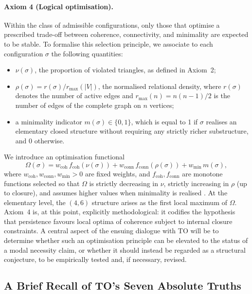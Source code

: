 \documentclass[11pt,a4paper]{article}
\begin{document}
\paragraph{Axiom 4 (Logical optimisation).}
Within the class of admissible configurations, only those that optimise a prescribed trade-off between coherence, connectivity, and minimality are expected to be stable. To formalise this selection principle, we associate to each configuration \(\sigma\) the following quantities:
\begin{itemize}
  \item \(\nu(\sigma)\), the proportion of violated triangles, as defined in Axiom~2;
  \item \(\rho(\sigma) = r(\sigma)/r_{\max}(|V|)\), the normalised relational density, where \(r(\sigma)\) denotes the number of active edges and \(r_{\max}(n) = n(n-1)/2\) is the number of edges of the complete graph on \(n\) vertices;
  \item a minimality indicator \(m(\sigma) \in \{0,1\}\), which is equal to 1 if \(\sigma\) realises an elementary closed structure without requiring any strictly richer substructure, and 0 otherwise.
\end{itemize}
We introduce an optimisation functional
\[
\Omega(\sigma) = w_{\text{coh}}\,f_{\text{coh}}(\nu(\sigma)) + w_{\text{conn}}\,f_{\text{conn}}(\rho(\sigma)) + w_{\text{min}}\, m(\sigma),
\]
where \(w_{\text{coh}}, w_{\text{conn}}, w_{\text{min}} > 0\) are fixed weights, and \(f_{\text{coh}}, f_{\text{conn}}\) are monotone functions selected so that \(\Omega\) is strictly decreasing in \(\nu\), strictly increasing in \(\rho\) (up to closure), and assumes higher values when minimality is realised \cite{Laubscher_PDL_long}. At the elementary level, the \((4,6)\) structure arises as the first local maximum of \(\Omega\). Axiom~4 is, at this point, explicitly methodological: it codifies the hypothesis that persistence favours local optima of coherence subject to internal closure constraints. A central aspect of the ensuing dialogue with TO will be to determine whether such an optimisation principle can be elevated to the status of a modal necessity claim, or whether it should instead be regarded as a structural conjecture, to be empirically tested and, if necessary, revised.

\subsection{A Brief Recall of TO's Seven Absolute Truths}
\end{document}
